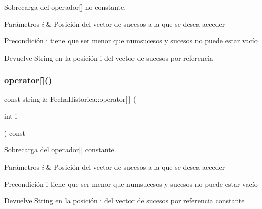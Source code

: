 Sobrecarga del operador\mbox{[}\mbox{]} no constante. 


\begin{DoxyParams}{Parámetros}
{\em i} & Posición del vector de sucesos a la que se desea acceder \\
\hline
\end{DoxyParams}
\begin{DoxyPrecond}{Precondición}
i tiene que ser menor que numsucesos y sucesos no puede estar vacío 
\end{DoxyPrecond}
\begin{DoxyReturn}{Devuelve}
String en la posición i del vector de sucesos por referencia 
\end{DoxyReturn}
\mbox{\label{classFechaHistorica_a5e7a2f86e52919a9e356711a202d9391}} 
\subsubsection{\texorpdfstring{operator[]()}{operator[]()}\hspace{0.1cm}{\footnotesize\ttfamily [2/2]}}
{\footnotesize\ttfamily const string \& Fecha\+Historica\+::operator\mbox{[}$\,$\mbox{]} (\begin{DoxyParamCaption}\item[{int}]{i }\end{DoxyParamCaption}) const}



Sobrecarga del operador\mbox{[}\mbox{]} constante. 


\begin{DoxyParams}{Parámetros}
{\em i} & Posición del vector de sucesos a la que se desea acceder \\
\hline
\end{DoxyParams}
\begin{DoxyPrecond}{Precondición}
i tiene que ser menor que numsucesos y sucesos no puede estar vacío 
\end{DoxyPrecond}
\begin{DoxyReturn}{Devuelve}
String en la posición i del vector de sucesos por referencia constante 
\end{DoxyReturn}
\mbox{\label{classFechaHistorica_a87e1ed09c8b726f325b544459a9c9ef9}} 
